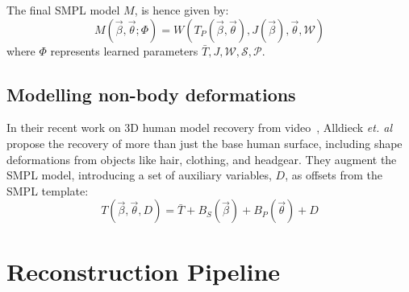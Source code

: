 \documentclass[9pt,twocolumn]{article}
\begin{document}
			\par{The final SMPL model $M$, is hence given by:
			\begin{equation}
				M(\vec{\beta},\vec{\theta};\Phi) = W(T_{P}(\vec{\beta},\vec{\theta}), J(\vec{\beta}), \vec{\theta}, \mathcal{W})
			\end{equation}
			where $\Phi$ represents learned parameters $\bar{T},J,\mathcal{W,S,P}$.
			}


	\subsection{Modelling non-body deformations}
		\par{In their recent work on 3D human model recovery from video~\cite{avatars}, Alldieck \textit{et. al} propose
		the recovery of more than just the base human surface, including shape deformations from objects like
		hair, clothing, and headgear. They augment the SMPL model, introducing a set of auxiliary variables, $D$, as offsets
		from the SMPL template:
		\begin{equation}
			T(\vec{\beta},\vec{\theta},D) = \bar{T} + B_{S}(\vec{\beta}) + B_{P}(\vec{\theta}) + D
		\end{equation}
		}

\section{Reconstruction Pipeline}
\end{document}
